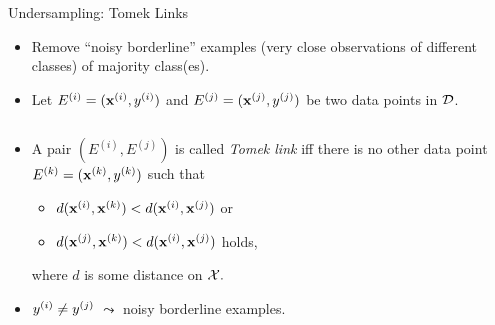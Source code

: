 \documentclass[11pt,compress,t,notes=noshow, xcolor=table]{beamer}
\begin{document}
\begin{frame}{Undersampling: Tomek Links}
    \small{

        \begin{itemize}            
            \item Remove ``noisy borderline'' examples (very close observations of different classes) of majority class(es).
            \item Let $E^{(i)} = (\xi,\yi)$ and $E^{(j)} = (\xv^{(j)},y^{(j)})$ be two data points in $\D$. %
        \end{itemize}
        \begin{columns}
            \begin{column}{0.7\textwidth}	
        
                \begin{itemize}

                    
                    \item A pair $(E^{(i)},E^{(j)})$ is called \emph{Tomek link} iff there is no other data point $E^{(k)} = (\xv^{(k)},y^{(k)})$ such that
        
                    \begin{itemize} 
                    \footnotesize
                
                       \item [] $d(\xv^{(i)}, \xv^{(k)}) < d(\xv^{(i)}, \xv^{(j)}) $ or
                       \item [] $d(\xv^{(j)}, \xv^{(k)}) < d(\xv^{(i)}, \xv^{(j)}) $ holds,
                    
                    \end{itemize}
        
                where $d$ is some distance on $\Xspace.$
                \item $\yi \neq \yi[j]$%
                $\leadsto$ noisy borderline examples.


\end{itemize}
\end{column}
\end{columns}}
\end{frame}
\end{document}
